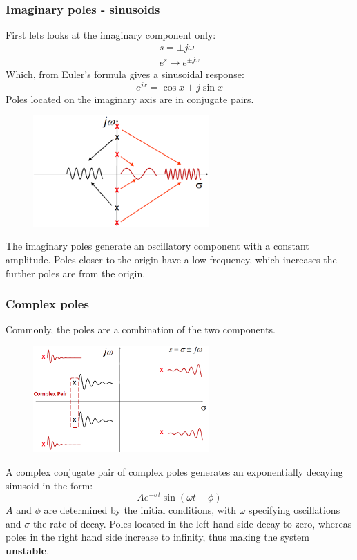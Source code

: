 \documentclass[class=report, crop=false, 12pt,a4paper]{standalone}
\begin{document}
\subsubsection{Imaginary poles - sinusoids}
First lets looks at the imaginary component only:
\begin{gather}
  s = \pm j\omega\\
  e^s \rightarrow e^{\pm j\omega}
\end{gather}
Which, from Euler's formula gives a sinusoidal response:
\begin{equation}
  e^{jx} = \cos{x} + j\sin{x}
\end{equation}
Poles located on the imaginary axis are in conjugate pairs.
\begin{figure}[H]
  \centering
  \includegraphics[width = 0.6\textwidth]{../img/diagram91.png}
  \caption{}
\end{figure}
The imaginary poles generate an oscillatory component with a constant amplitude. Poles closer to the origin have a low frequency, which increases the further poles are from the origin.
\subsubsection{Complex poles}
Commonly, the poles are a combination of the two components.
\begin{figure}[H]
  \centering
  \includegraphics[width = 0.6\textwidth]{../img/diagram92.png}
  \caption{}
\end{figure}
A complex conjugate pair of complex poles generates an exponentially decaying sinusoid in the form: 
\begin{equation}
  Ae^{-\sigma t}\sin{\left(\omega t + \phi\right)}
\end{equation}
$A$ and $\phi$ are determined by the initial conditions, with $\omega$ specifying oscillations and $\sigma$ the rate of decay. Poles located in the left hand side decay to zero, whereas poles in the right hand side increase to infinity, thus making the system \textbf{unstable}.
\end{document}
